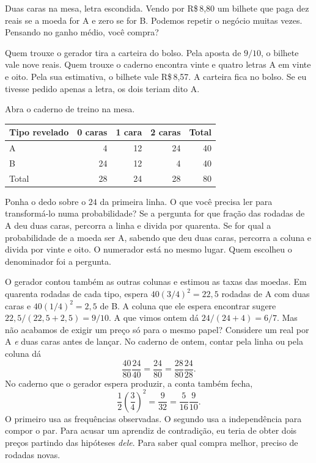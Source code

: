 Duas caras na mesa, letra escondida. Vendo por R\$\,8,80 um bilhete que paga dez reais se a moeda for A e zero se for B. Podemos repetir o negócio muitas vezes. Pensando no ganho médio, você compra?

Quem trouxe o gerador tira a carteira do bolso. Pela aposta de $9/10$, o bilhete vale nove reais. Quem trouxe o caderno encontra vinte e quatro letras A em vinte e oito. Pela sua estimativa, o bilhete vale R\$\,8,57. A carteira fica no bolso. Se eu tivesse pedido apenas a letra, os dois teriam dito A.

Abra o caderno de treino na mesa.
\begin{center}
\begin{tabular}{lrrrr}
\toprule
Tipo revelado & 0 caras & 1 cara & 2 caras & Total\\
\midrule
A & 4 & 12 & 24 & 40\\
B & 24 & 12 & 4 & 40\\
\midrule
Total & 28 & 24 & 28 & 80\\
\bottomrule
\end{tabular}
\end{center}

Ponha o dedo sobre o $24$ da primeira linha. O que você precisa ler para transformá-lo numa probabilidade? Se a pergunta for que fração das rodadas de A deu duas caras, percorra a linha e divida por quarenta. Se for qual a probabilidade de a moeda ser A, sabendo que deu duas caras, percorra a coluna e divida por vinte e oito. O numerador está no mesmo lugar. Quem escolheu o denominador foi a pergunta.

O gerador contou também as outras colunas e estimou as taxas das moedas. Em quarenta rodadas de cada tipo, espera $40(3/4)^2=22{,}5$ rodadas de A com duas caras e $40(1/4)^2=2{,}5$ de B. A coluna que ele espera encontrar sugere $22{,}5/(22{,}5+2{,}5)=9/10$. A que vimos ontem dá $24/(24+4)=6/7$. Mas não acabamos de exigir um preço só para o mesmo papel? Considere um real por A \emph{e} duas caras antes de lançar. No caderno de ontem, contar pela linha ou pela coluna dá
\[
        \frac{40}{80}\frac{24}{40}
        =\frac{24}{80}
        =\frac{28}{80}\frac{24}{28}.
\]
No caderno que o gerador espera produzir, a conta também fecha,
\[
        \frac12\left(\frac34\right)^2
        =\frac{9}{32}
        =\frac{5}{16}\frac9{10}.
\]
O primeiro usa as frequências observadas. O segundo usa a independência para compor o par. Para acusar um aprendiz de contradição, eu teria de obter dois preços partindo das hipóteses \emph{dele}. Para saber qual compra melhor, preciso de rodadas novas.

